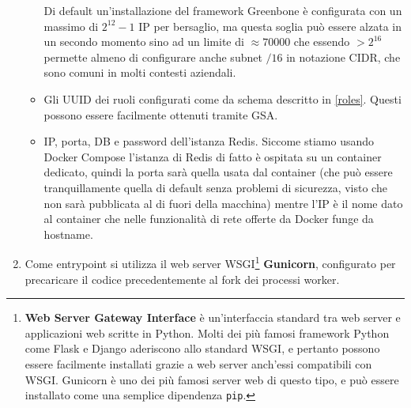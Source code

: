 \begin{enumerate}
\begin{itemize}
        Di default un'installazione del framework Greenbone è configurata con un massimo di $2^{12}-1$ IP per bersaglio, ma questa soglia può essere alzata in un secondo momento sino ad un limite di $\approx 70000$ che essendo $> 2^{16}$ permette almeno di configurare anche subnet $/16$ in notazione CIDR, che sono comuni in molti contesti aziendali.
        \item Gli UUID dei ruoli configurati come da schema descritto in \ref{roles}. Questi possono essere facilmente ottenuti tramite GSA.
        \item IP, porta, DB e password dell'istanza Redis. Siccome stiamo usando Docker Compose l'istanza di Redis di fatto è ospitata su un container dedicato, quindi la porta sarà quella usata dal container (che può essere tranquillamente quella di default senza problemi di sicurezza, visto che non sarà pubblicata al di fuori della macchina) mentre l'IP è il nome dato al container che nelle funzionalità di rete offerte da Docker funge da hostname.
    \end{itemize}
    \item Come entrypoint si utilizza il web server WSGI\footnote{\textbf{Web Server Gateway Interface} è un'interfaccia standard tra web server e applicazioni web scritte in Python. Molti dei più famosi framework Python come Flask e Django aderiscono allo standard WSGI, e pertanto possono essere facilmente installati grazie a web server anch'essi compatibili con WSGI. Gunicorn è uno dei più famosi server web di questo tipo, e può essere installato come una semplice dipendenza \texttt{pip}.} \textbf{Gunicorn}, configurato per precaricare il codice precedentemente al fork dei processi worker.
\end{enumerate}


